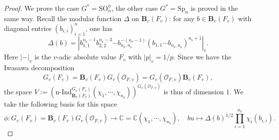 \documentclass[12pt,oneside,reqno]{amsart}
\theoremstyle{plain}
\begin{document}
	\begin{proof}
		We prove the case $G^\ast=\mathrm{SO}_n^\eta$, the other case $G^\ast=\mathrm{Sp}_n$ is proved in the same way.
		Recall the modular function
		$\Delta$
		on
		$\mathbf{B}_v(F_v)$:
		for any
		$b\in
		\mathbf{B}_v(F_v)$
		with diagonal entries
		$(b_{i,i})_{i=1}^n$,
		one has
		\[
		\Delta
		(b)
		=
		|
		b_{1,1}^{n_\mathrm{s}-1}b_{2,2}^{n_\mathrm{s}-3}
		\cdots
		b_{n_\mathrm{s},n_\mathrm{s}}^{-(n_\mathrm{s}-1)}
		(
		b_{1,1}\cdots
		b_{n_\mathrm{s},n_\mathrm{s}}
		)^{n_\mathrm{s}+1}
		|_v.
		\]
		Here
		$|-|_v$
		is the $v$-adic absolute value
		$F_v$
		with
		$|p|_v=1/p$.
		Since we have the Iwasawa decomposition
		\begin{equation}\label{Iwasawa decomposition}
			\tag{$\ast$}
			G_v(F_v)
			=
			\mathbf{B}_v(F_v)
			G_v(\mathcal{O}_{F,v})
			=
			G_v(\mathcal{O}_{F,v})
			\mathbf{B}_v(F_v),
		\end{equation}
		the space
		$V:=
		(\mathrm{n}\text{-}\mathrm{Ind}_{\mathbf{B}_v(F_v)}^{ G_v(F_v)}
		(\chi_1,\cdots,\chi_{n_\mathrm{s}}))^{ G_v(\mathcal{O}_{F,v})}$
		is thus of dimension $1$. We take the following basis for this space
		\[
		\phi
		\colon
		G_v(F_v)=
		\mathbf{B}_v(F_v)
		G_v(\mathcal{O}_{F,v})
		\rightarrow
		\mathbb{C}
		=
		\mathbb{C}(\chi_1,\cdots,\chi_{n_\mathrm{s}}),
		\quad
		bu
		\mapsto
		\Delta(b)^{1/2}
		\prod_{i=1}^{n_\mathrm{s}}
		\chi_i(b_{i,i}).
		\]
		

\end{proof}
\end{document}
